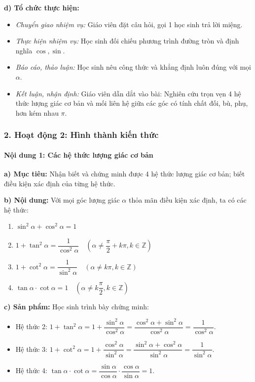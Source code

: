 \documentclass[12pt, a4paper]{article}
\begin{document}
\textbf{d) Tổ chức thực hiện:}
\begin{itemize}[leftmargin=0.6cm]
    \item \textit{Chuyển giao nhiệm vụ:} Giáo viên đặt câu hỏi, gọi 1 học sinh trả lời miệng.
    \item \textit{Thực hiện nhiệm vụ:} Học sinh đối chiếu phương trình đường tròn và định nghĩa $\cos, \sin$.
    \item \textit{Báo cáo, thảo luận:} Học sinh nêu công thức và khẳng định luôn đúng với mọi $\alpha$.
    \item \textit{Kết luận, nhận định:} Giáo viên dẫn dắt vào bài: Nghiên cứu trọn vẹn 4 hệ thức lượng giác cơ bản và mối liên hệ giữa các góc có tính chất đối, bù, phụ, hơn kém nhau $\pi$.
\end{itemize}

\subsubsection*{2. Hoạt động 2: Hình thành kiến thức}

\paragraph{Nội dung 1: Các hệ thức lượng giác cơ bản}
\textbf{a) Mục tiêu:} Nhận biết và chứng minh được 4 hệ thức lượng giác cơ bản; biết điều kiện xác định của từng hệ thức.

\textbf{b) Nội dung:}
Với mọi góc lượng giác $\alpha$ thỏa mãn điều kiện xác định, ta có các hệ thức:
\begin{enumerate}[leftmargin=0.8cm]
    \item $\sin^2\alpha + \cos^2\alpha = 1$
    \item $1 + \tan^2\alpha = \dfrac{1}{\cos^2\alpha} \quad \left(\alpha \neq \dfrac{\pi}{2} + k\pi, k \in \mathbb{Z}\right)$
    \item $1 + \cot^2\alpha = \dfrac{1}{\sin^2\alpha} \quad (\alpha \neq k\pi, k \in \mathbb{Z})$
    \item $\tan\alpha \cdot \cot\alpha = 1 \quad \left(\alpha \neq k\dfrac{\pi}{2}, k \in \mathbb{Z}\right)$
\end{enumerate}

\textbf{c) Sản phẩm:} Học sinh trình bày chứng minh:
\begin{itemize}[leftmargin=0.6cm]
    \item Hệ thức 2: $1 + \tan^2\alpha = 1 + \dfrac{\sin^2\alpha}{\cos^2\alpha} = \dfrac{\cos^2\alpha + \sin^2\alpha}{\cos^2\alpha} = \dfrac{1}{\cos^2\alpha}$.
    \item Hệ thức 3: $1 + \cot^2\alpha = 1 + \dfrac{\cos^2\alpha}{\sin^2\alpha} = \dfrac{\sin^2\alpha + \cos^2\alpha}{\sin^2\alpha} = \dfrac{1}{\sin^2\alpha}$.
    \item Hệ thức 4: $\tan\alpha \cdot \cot\alpha = \dfrac{\sin\alpha}{\cos\alpha} \cdot \dfrac{\cos\alpha}{\sin\alpha} = 1$.
\end{itemize}
\end{document}
